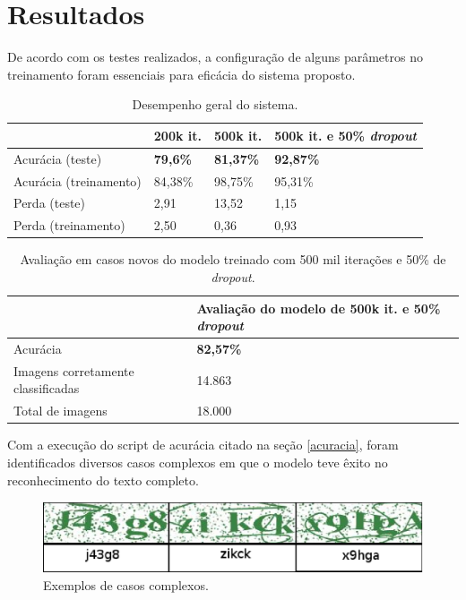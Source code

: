 \section{Resultados}

De acordo com os testes realizados, a configuração de alguns
parâmetros no treinamento foram essenciais para eficácia do sistema
proposto.

\begin{table}[H]
\begin{center}
\begin{tabular}{|p{2.3cm}|p{2.3cm}|p{2.3cm}|p{2.3cm}|}
\hline
\textbf{} & \textbf{200k it.} & \textbf{500k it.} & \textbf{500k it. e 50\% \textit{dropout}} \\
\hline
Acurácia (teste) & {\bf 79,6\%} & {\bf 81,37\%} & {\bf 92,87\%} \\
\hline
Acurácia (treinamento) & 84,38\% & 98,75\% & 95,31\% \\
\hline
Perda (teste) & 2,91 & 13,52 & 1,15 \\
\hline
Perda (treinamento) & 2,50 & 0,36 & 0,93 \\
\hline
\end{tabular}
\caption{Desempenho geral do sistema.}
\label{tab:system_efficency}
\end{center}
\end{table}

\begin{table}[H]
\begin{center}
\begin{tabular}{|p{5cm}|p{5cm}|}
\hline
\textbf{} & \textbf{Avaliação do modelo de 500k it. e 50\% \textit{dropout}} \\
\hline
Acurácia & {\bf 82,57\%} \\
\hline
Imagens corretamente classificadas & 14.863 \\
\hline
Total de imagens & 18.000 \\
\hline
\end{tabular}
\caption{Avaliação em casos novos do modelo treinado com 500 mil
  iterações e 50\% de \textit{dropout}.}
\label{tab:system_evaluation}
\end{center}
\end{table}

Com a execução do script de acurácia citado na seção \ref{acuracia},
foram identificados diversos casos complexos em que o modelo teve
êxito no reconhecimento do texto completo.

\begin{figure}[H]
\centering
\includegraphics[scale=0.8]{imagens/complex_cases}
\caption{Exemplos de casos complexos.}
\label{fig:complex_cases}
\end{figure}

